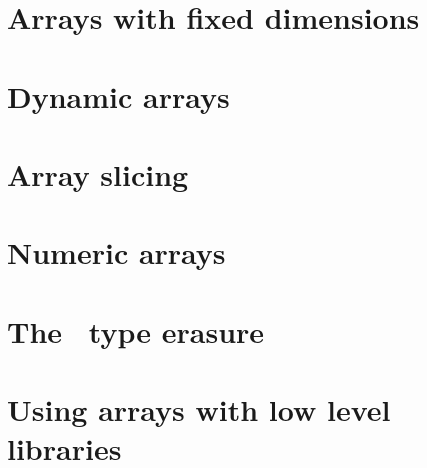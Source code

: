 %

\section{Arrays with fixed dimensions}


\section{Dynamic arrays}\label{sec:array:dynamic_arrays}

\section{Array slicing}\label{sec:array:array_slicing}

\section{Numeric arrays}\label{sec:array:numeric_arrays}

\section{The \arrayerasure\ type erasure}\label{sec:array:type_erasure}

\section{Using arrays with low level libraries}

